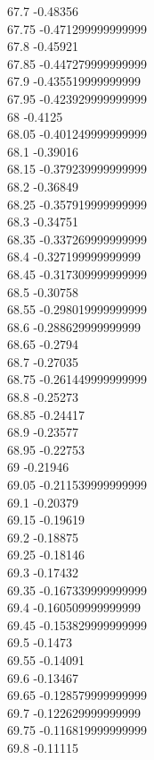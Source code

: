 {67.7	-0.48356\\
67.75	-0.471299999999999\\
67.8	-0.45921\\
67.85	-0.447279999999999\\
67.9	-0.435519999999999\\
67.95	-0.423929999999999\\
68	-0.4125\\
68.05	-0.401249999999999\\
68.1	-0.39016\\
68.15	-0.379239999999999\\
68.2	-0.36849\\
68.25	-0.357919999999999\\
68.3	-0.34751\\
68.35	-0.337269999999999\\
68.4	-0.327199999999999\\
68.45	-0.317309999999999\\
68.5	-0.30758\\
68.55	-0.298019999999999\\
68.6	-0.288629999999999\\
68.65	-0.2794\\
68.7	-0.27035\\
68.75	-0.261449999999999\\
68.8	-0.25273\\
68.85	-0.24417\\
68.9	-0.23577\\
68.95	-0.22753\\
69	-0.21946\\
69.05	-0.211539999999999\\
69.1	-0.20379\\
69.15	-0.19619\\
69.2	-0.18875\\
69.25	-0.18146\\
69.3	-0.17432\\
69.35	-0.167339999999999\\
69.4	-0.160509999999999\\
69.45	-0.153829999999999\\
69.5	-0.1473\\
69.55	-0.14091\\
69.6	-0.13467\\
69.65	-0.128579999999999\\
69.7	-0.122629999999999\\
69.75	-0.116819999999999\\
69.8	-0.11115\\
}
